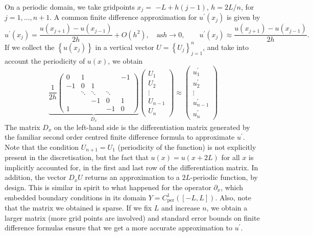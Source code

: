 \documentclass[a4paper]{siamart220329}
\theoremstyle{plain}
\begin{document}
On a periodic domain, we take gridpoints $x_{j}=$ $-L+h(j-1)$,  $h = 2L/n$, for
$j=1, \ldots, n+1$. A common finite difference approximation for
$u^{\prime}\left(x_{j}\right)$ is given by 
\[
u^{\prime}\left(x_{j}\right)
= \frac{u\left(x_{j+1}\right)-u\left(x_{j-1}\right)}{2h} + O(h^2), \quad \text{as
$h\to 0$}, \qquad
u^{\prime}\left(x_{j}\right)
\approx\frac{u\left(x_{j+1}\right)-u\left(x_{j-1}\right)}{2h}.
\]
If we collect
the $\left\{u\left(x_{j}\right)\right\}$ in a vertical vector
$U=\left\{U_{j}\right\}_{j=1}^{n}$, and take into account the periodicity of $u(x)$,
we obtain
\begin{equation}\label{eq:dxMat}
\underbrace{
\frac{1}{2 h}
\begin{pmatrix}
0 & 1 & & & -1 \\
-1 & 0 & 1 & & \\
& \ddots & \ddots & \ddots & \\
& & -1 & 0 & 1 \\
1 & & & -1 & 0
\end{pmatrix}
}_{D_x}
\begin{pmatrix}
U_{1} \\
U_{2} \\
\vdots \\
U_{n-1} \\
U_{n}
\end{pmatrix}
\approx
\begin{pmatrix}
u_{1}^{\prime} \\
u_{2}^{\prime} \\
\vdots \\
u_{n-1}^{\prime} \\
u_{n}^{\prime}
\end{pmatrix}
\end{equation}
The matrix $D_x$ on the left-hand side is the differentiation matrix generated by the
familiar second order centred finite difference formula to approximate $u^{\prime}$.
Note that the condition $U_{n+1} = U_1$ (periodicity of the function) is not explicitly present in the
discretisation, but the fact that $u(x) = u(x+2L)$ for all $x$ is implicitly
accounted for, in the first and last row of the differentiation matrix. In addition, the
vector $D_x U$ returns an approximation to a $2L$-periodic function, by design. This is
similar in spirit to what happened for the operator $\partial_x$, which embedded
boundary conditions in its domain $Y=C^1_\textrm{per}([-L,L])$. Also, note
that the matrix we obtained is sparse. If we fix $L$ and increase $n$, we obtain a
larger matrix (more grid points are involved) and standard error bounds on finite
difference formulas ensure that we get a more accurate approximation to $u^{\prime}$.
\end{document}
